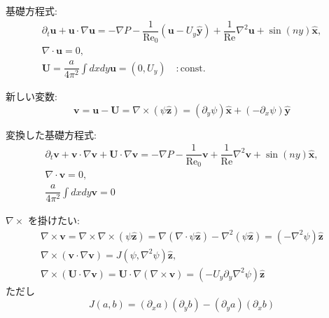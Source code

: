 \documentclass[12pt, a4j]{jsarticle}
\newcommand{\p}{\partial}
\renewcommand{\Re}{\mathrm{Re}}
\begin{document}
基礎方程式:
\begin{gather}
    \p_{t} \bm{u} 
    + \bm{u} \cdot \nabla \bm{u}
    = - \nabla P 
      - \dfrac{1}{\Re_{0}} (\bm{u} - U_{y} \hat{\bm{y}})
      + \dfrac{1}{\Re} \nabla^{2} \bm{u}
      + \sin{(n y)} \hat{\bm{x}},
    \\
    \nabla \cdot \bm{u}
    = 0,
    \\
    \bm{U}
    = \dfrac{a}{4 \pi^{2}} \int dxdy \bm{u}
    = (0, U_{y})
    \quad : \text{const.}
\end{gather}

新しい変数:
\begin{equation}
    \bm{v} 
    = \bm{u} - \bm{U}
    = \nabla \times (\psi \hat{\bm{z}})
    = (\p_{y} \psi) \hat{\bm{x}}
      + (- \p_{x} \psi) \hat{\bm{y}}
\end{equation}

変換した基礎方程式:
\begin{gather}
    \p_{t} \bm{v} 
    + \bm{v} \cdot \nabla \bm{v}
    + \bm{U} \cdot \nabla \bm{v}
    = - \nabla P 
      - \dfrac{1}{\Re_{0}} \bm{v}
      + \dfrac{1}{\Re} \nabla^{2} \bm{v}
      + \sin{(n y)} \hat{\bm{x}},
    \\
    \nabla \cdot \bm{v}
    = 0,
    \\
    \dfrac{a}{4 \pi^{2}} \int dxdy \bm{v}
    = 0
\end{gather}

$\nabla \times$ を掛けたい:
\begin{gather}
    \nabla \times \bm{v}
    = \nabla \times \nabla \times (\psi \hat{\bm{z}})
    = \nabla (\nabla \cdot \psi \hat{\bm{z}})
      - \nabla^{2} (\psi \hat{\bm{z}})
    = (- \nabla^{2} \psi) \hat{\bm{z}}
    \\
    \nabla \times (\bm{v} \cdot \nabla \bm{v})
    = J(\psi, \nabla^{2} \psi) \hat{\bm{z}},
    \\
    \nabla \times (\bm{U} \cdot \nabla \bm{v})
    = \bm{U} \cdot \nabla (\nabla \times \bm{v})
    = (- U_{y} \p_{y} \nabla^{2} \psi) \hat{\bm{z}}
\end{gather}
ただし
\begin{equation}
    J(a, b)
    = (\p_{x} a) (\p_{y} b) - (\p_{y} a) (\p_{x} b)
\end{equation}
\end{document}
